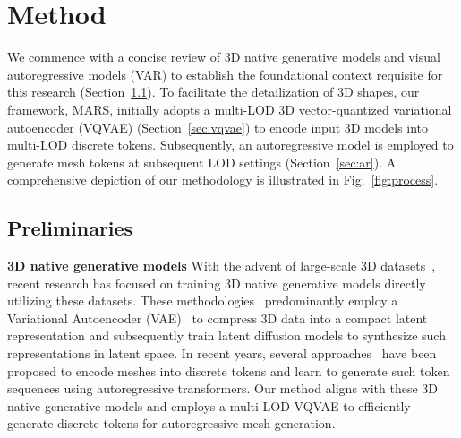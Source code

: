 \section{Method}
We commence with a concise review of 3D native generative models and visual autoregressive models (VAR) to establish the foundational context requisite for this research (Section~\ref{sec:preliminaries}). To facilitate the detailization of 3D shapes, our framework, MARS, initially adopts a multi-LOD 3D vector-quantized variational autoencoder (VQVAE) (Section~\ref{sec:vqvae}) to encode input 3D models into multi-LOD discrete tokens. Subsequently, an autoregressive model is employed to generate mesh tokens at subsequent LOD settings (Section~\ref{sec:ar}). A comprehensive depiction of our methodology is illustrated in Fig.~\ref{fig:process}.

\subsection{Preliminaries}
\label{sec:preliminaries}
\noindent\textbf{3D native generative models}
With the advent of large-scale 3D datasets~\cite{objaverse,objaversexl}, recent research has focused on training 3D native generative models directly utilizing these datasets. These methodologies~\cite{shape,LN3Diff,craftsman,direct3d,3dshape2vecset,michelangelo,3dtopia,clay} predominantly employ a Variational Autoencoder (VAE)~\cite{vae} to compress 3D data into a compact latent representation and subsequently train latent diffusion models to synthesize such representations in latent space. In recent years, several approaches~\cite{meshanything,meshanything2,meshgpt} have been proposed to encode meshes into discrete tokens and learn to generate such token sequences using autoregressive transformers. Our method aligns with these 3D native generative models and employs a multi-LOD VQVAE to efficiently generate discrete tokens for autoregressive mesh generation.


